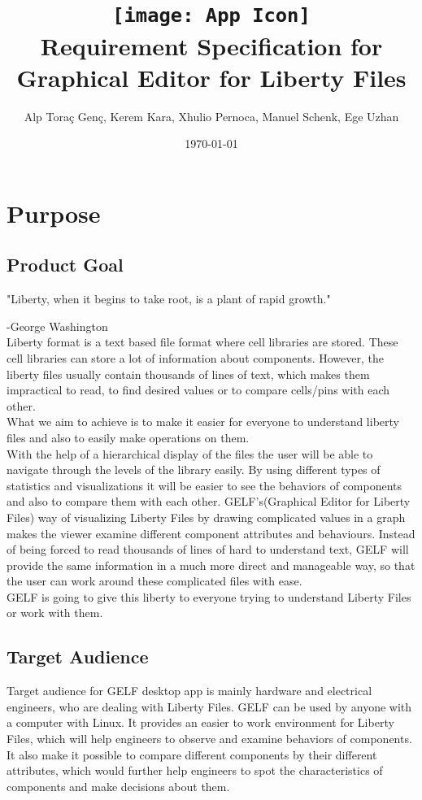 \documentclass[10pt,a4paper]{report}
\title{\texttt{[image: App Icon]}\\Requirement Specification for Graphical Editor for Liberty Files}
\author{Alp Toraç Genç, Kerem Kara, Xhulio Pernoca, Manuel Schenk, Ege Uzhan}
\date{\today}
\begin{document}
\maketitle
\label{sec:title}
\tableofcontents

\chapter{Purpose}
\section{Product Goal}
\setlength{\parindent}{0pt}
"Liberty, when it begins to take root, is a plant of rapid growth." 

-George Washington \\


Liberty format is a text based file format where cell libraries are stored. These cell libraries can store a lot of information about components. However, the liberty files usually contain thousands of lines of text, which makes them impractical to read, to find desired values or to compare cells/pins with each other.
\\

What we aim to achieve is to make it easier for everyone to understand liberty files and also to easily make operations on them.
\\

With the help of a hierarchical display of the files the user will be able to navigate through the levels of the library easily. By using different types of statistics and visualizations it will be easier to see the behaviors of components and also to compare them with each other. GELF's(Graphical Editor for Liberty Files) way of visualizing Liberty Files by drawing complicated values in a graph makes the viewer examine different component attributes and behaviours. Instead of being forced to read thousands of lines of hard to understand text, GELF will provide the same information in a much more direct and manageable way, so that the user can work around these complicated files with ease.
\\

GELF is going to give this liberty to everyone trying to understand Liberty Files or work with them.
\section{Target Audience}
Target audience for GELF desktop app is mainly hardware and electrical engineers, who are dealing with Liberty Files. GELF can be used by anyone with a computer with Linux. It provides an easier to work environment for Liberty Files, which will help engineers to observe and examine behaviors of components. It also make it possible to compare different components by their different attributes, which would further help engineers to spot the characteristics of components and make decisions about them.
\end{document}
